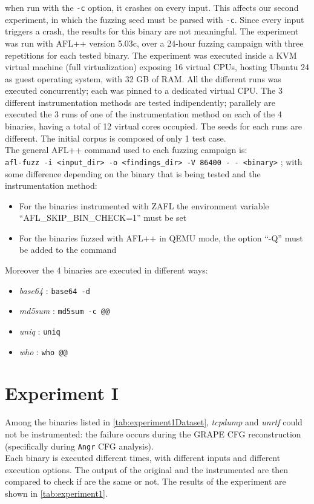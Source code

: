     when run with the \texttt{-c} option, it crashes on every input. 
    This affects our second experiment, in which the fuzzing seed must be parsed with \texttt{-c}. 
    Since every input triggers a crash, the results for this binary are not meaningful.
    The experiment was run with AFL++ version 5.03c, over a 24-hour fuzzing campaign with three repetitions for each tested binary.
    The experiment was executed inside a KVM virtual machine (full virtualization) exposing 16 virtual CPUs, hosting 
    Ubuntu 24 as guest operating system, with 32 GB of RAM. 
    All the different runs was executed concurrently; each was pinned to a dedicated virtual CPU. 
    The 3 different instrumentation methods are tested indipendently; parallely are executed the 3 runs of one of the instrumentation 
    method on each of the 4 binaries, having a total of 12 virtual cores occupied.
    The seeds for each runs are different.
    The initial corpus is composed of only 1 test case.\\
    The general AFL++ command used to each fuzzing campaign is:\\
    \texttt{afl-fuzz -i <input\_dir> -o <findings\_dir> -V 86400   -\,- <binary>} ;
    with some difference depending on the binary that is being tested and the instrumentation method:
    \begin{itemize}
        \item For the binaries instrumented with ZAFL the environment variable \\``AFL\_SKIP\_BIN\_CHECK=1'' must be set
        \item For the binaries fuzzed with AFL++ in QEMU mode, the option ``-Q'' must be added to the command
    \end{itemize}
    Moreover the 4 binaries are executed in different ways:
    \begin{itemize}
        \item \textit{base64} : \texttt{base64 -d}
        \item \textit{md5sum} : \texttt{md5sum -c @@}
        \item \textit{uniq} : \texttt{uniq}
        \item \textit{who} : \texttt{who @@} 
    \end{itemize}

    
\section{Experiment I}\label{sec:experiment1}
Among the binaries listed in \cref{tab:experiment1Dataset}, 
\textit{tcpdump} and \textit{unrtf} could not be instrumented: the failure occurs 
during the GRAPE \gls{CFG} reconstruction (specifically during \texttt{Angr} CFG analysis).\\
Each binary is executed different times, with different inputs and different execution options.
The output of the original and the instrumented are then compared to check if are the same or not.
The results of the experiment are shown in \cref{tab:experiment1}.\\

